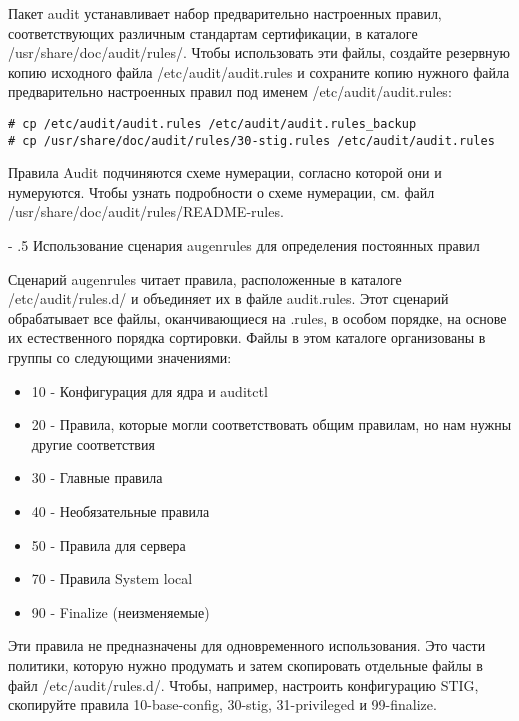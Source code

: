 \documentclass[a4paper,10pt,twoside]{article}
\makeatletter
\renewcommand\paragraph{%
   \@startsection{paragraph}{4}{0mm}%
      {-\baselineskip}%
      {.5\baselineskip}%
      {\normalfont\normalsize\bfseries}}
\makeatother
\begin{document}
Пакет audit устанавливает набор предварительно настроенных правил, соответствующих различным стандартам сертификации, в каталоге /usr/share/doc/audit/rules/.
Чтобы использовать эти файлы, создайте резервную копию исходного файла /etc/audit/audit.rules и сохраните копию нужного файла предварительно настроенных правил под именем /etc/audit/audit.rules:

\begin{verbatim}
# cp /etc/audit/audit.rules /etc/audit/audit.rules_backup
# cp /usr/share/doc/audit/rules/30-stig.rules /etc/audit/audit.rules
\end{verbatim} 


Правила Audit подчиняются схеме нумерации, согласно которой они и нумеруются. Чтобы узнать подробности о схеме нумерации, см. файл /usr/share/doc/audit/rules/README-rules.



\paragraph{Использование сценария augenrules для определения постоянных правил}

Сценарий augenrules читает правила, расположенные в каталоге /etc/audit/rules.d/ и объединяет их в файле audit.rules. Этот сценарий обрабатывает все файлы, оканчивающиеся на .rules, в особом порядке, на основе их естественного порядка сортировки. Файлы в этом каталоге организованы в группы со следующими значениями:

\begin{itemize}
\item 10 - Конфигурация для ядра и auditctl
\item 20 - Правила, которые могли соответствовать общим правилам, но нам нужны другие соответствия
\item 30 - Главные правила
\item 40 - Необязательные правила
\item 50 - Правила для сервера
\item 70 - Правила System local
\item 90 - Finalize (неизменяемые)
\end{itemize}



Эти правила не предназначены для одновременного использования. Это части политики, которую нужно продумать и затем скопировать отдельные файлы в файл /etc/audit/rules.d/. Чтобы, например, настроить конфигурацию STIG, скопируйте правила 10-base-config, 30-stig, 31-privileged и 99-finalize.
\end{document}
